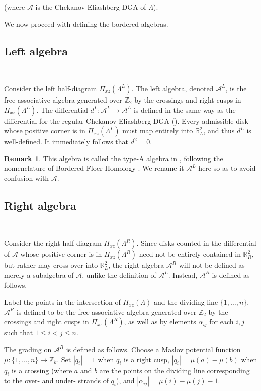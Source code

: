 \documentclass[a4paper,final, reqno]{amsart}
\theoremstyle{plain}
\theoremstyle{definition}
\newtheorem{Rem}[Th]{Remark}
\newcommand{\A}{\mathcal{A}}
\begin{document}
	(where $\A$ is the Chekanov-Eliashberg DGA of $\Lambda$).
	
	We now proceed with defining the bordered algebras.
	
	\subsection{Left algebra} \-\
	
	Consider the left half-diagram $\Pi_{xz}(\Lambda^L)$. The left algebra, denoted $\A^L$, is the free associative algebra generated over $\mathbb{Z}_2$ by the crossings and right cusps in $\Pi_{xz}(\Lambda^L)$. The differential $d^L: \A^L\to \A^L$ is defined in the same way as the differential for the regular Chekanov-Eliashberg DGA (). Every admissible disk whose positive corner is in $\Pi_{xz}(\Lambda^L)$ must map entirely into $\mathbb{R}^2_L$, and thus $d^L$ is well-defined. It immediately follows that $d^2=0$. 
	
	
	\begin{Rem}
		This algebra is called the type-A algebra in \cite{sivek}, following the nomenclature of Bordered Floer Homology \cite{borderedhf}. We rename it $\A^L$ here so as to avoid confusion with $\A$.
	\end{Rem}
	
	\subsection{Right algebra} \-\
	
	Consider the right half-diagram $\Pi_{xz}(\Lambda^R)$. Since disks counted in the differential of $\A$ whose positive corner is in $\Pi_{xz}(\Lambda^R)$ {need not be} entirely contained in $\mathbb{R}^2_R$, but rather may cross over into $\mathbb{R}^2_L$, the right algebra $\A^R$ will not be defined as merely a subalgebra of $\A$, unlike the definition of $\A^L$. Instead, $\A^R$ is defined as follows.
	
	Label the points in the intersection of $\Pi_{xz}(\Lambda)$ and the dividing line $\{1,\dots, n\}$. $\A^R$ is defined to be the free associative algebra generated over $\mathbb{Z}_2$ by the crossings and right cusps in $\Pi_{xz}(\Lambda^R)$, as well as by elements $\alpha_{ij}$ for each $i,j$ such that $1\leq i<j\leq n$. 
	
	The grading on $\A^R$ is defined as follows. Choose a Maslov potential function $\mu:\{1,\dots, n\} \to \mathbb{Z}_k$. Set $|q_i| = 1$ when $q_i$ is a right cusp, $|q_i| = \mu(a)-\mu(b)$ when $q_i$ is a crossing (where $a$ and $b$ are the points on the dividing line corresponding to the over- and under- strands of $q_i$), and $|\alpha_{ij}| = \mu(i)-\mu(j)-1$.
	
\end{document}
